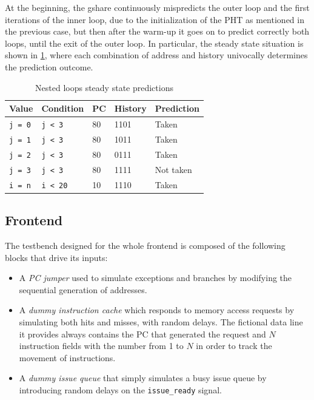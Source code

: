At the beginning, the gshare continuously mispredicts the outer loop and the first iterations of the inner loop, due to the initialization of the \ac{PHT} as mentioned in the previous case, but then after the warm-up it goes on to predict correctly both loops, until the exit of the outer loop. In particular, the steady state situation is shown in \cref{tab:nested}, where each combination of address and history univocally determines the prediction outcome.
\begin{table}[hbt]
  \centering
  \begin{tabular}{lllll}
    \toprule
    \textbf{Value} & \textbf{Condition} & \textbf{\ac{PC}} & \textbf{History} & \textbf{Prediction} \\ \midrule
    \texttt{j = 0} & \texttt{j < 3}   & 80  & 1101  & Taken     \\ \midrule
    \texttt{j = 1} & \texttt{j < 3}   & 80  & 1011  & Taken     \\ \midrule
    \texttt{j = 2} & \texttt{j < 3}   & 80  & 0111  & Taken     \\ \midrule
    \texttt{j = 3} & \texttt{j < 3}   & 80  & 1111  & Not taken \\ \midrule
    \texttt{i = n} & \texttt{i < 20}  & 10  & 1110  & Taken     \\
    \bottomrule
  \end{tabular}
  \caption{Nested loops steady state predictions}
  \label{tab:nested}
\end{table}

\subsection{Frontend}
The testbench designed for the whole frontend is composed of the following blocks that drive its inputs:
\begin{itemize}
  \item A \emph{\ac{PC} jumper} used to simulate exceptions and branches by modifying the sequential generation of addresses.
  \item A \emph{dummy instruction cache} which responds to memory access requests by simulating both hits and misses, with random delays. The fictional data line it provides always contains the \ac{PC} that generated the request and $N$ instruction fields with the number from 1 to $N$ in order to track the movement of instructions.
  \item A \emph{dummy issue queue} that simply simulates a busy issue queue by introducing random delays on the \texttt{issue\_ready} signal.
\end{itemize}

